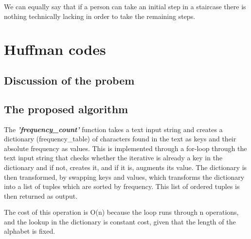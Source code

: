 \documentclass[11pt]{article}
\begin{document}
We can equally say that if a person can take an initial step in a
staircase there is nothing technically lacking in order to take the
remaining steps.

    \section{Huffman codes}\label{huffman-codes}

\subsection{Discussion of the probem}\label{discussion-of-the-probem}

    \subsection{The proposed algorithm}\label{the-proposed-algorithm}

    The \textbf{\emph{'frequency\_count'}} function takes a text input
string and creates a dictionary (frequency\_table) of characters found
in the text as keys and their absolute frequency as values. This is
implemented through a for-loop through the text input string that checks
whether the iterative is already a key in the dictionary and if not,
creates it, and if it is, augments its value. The dictionary is then
transformed, by swapping keys and values, which transforms the
dictionary into a list of tuples which are sorted by frequency. This
list of ordered tuples is then returned as output.

The cost of this operation is O(n) because the loop runs through n
operations, and the lookup in the dictionary is constant cost, given
that the length of the alphabet is fixed.
\end{document}
